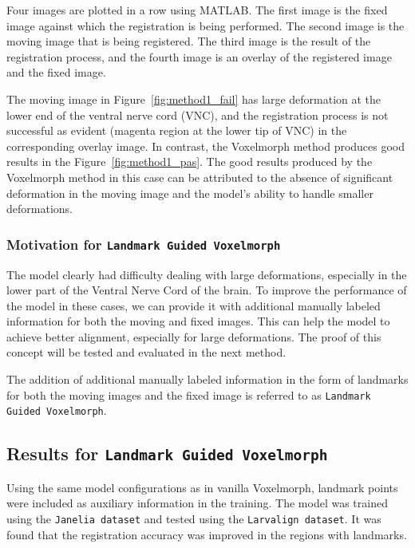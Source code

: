 \documentclass{book}
\begin{document}
	Four images are plotted in a row using MATLAB. The first image is the fixed image against which the registration is being performed. The second image is the moving image that is being registered. The third image is the result of the registration process, and the fourth image is an overlay of the registered image and the fixed image.
	
	The moving image in Figure~\ref{fig:method1_fail} has large deformation at the lower end of the ventral nerve cord (VNC), and the registration process is not successful as evident (magenta region at the lower tip of VNC) in the corresponding overlay image. In contrast, the Voxelmorph method produces good results in the Figure~\ref{fig:method1_pas}. The good results produced by the Voxelmorph method in this case can be attributed to the absence of significant deformation in the moving image and the model's ability to handle smaller deformations.

	
	\subsubsection{Motivation for \texttt{Landmark Guided Voxelmorph}} \label{subsec:motivation_for_method2}
	The model clearly had difficulty dealing with large deformations, especially in the lower part of the Ventral Nerve Cord of the brain. To improve the performance of the model in these cases, we can provide it with additional manually labeled information for both the moving and fixed images. This can help the model to achieve better alignment, especially for large deformations. The proof of this concept will be tested and evaluated in the next method.
	
	The addition of additional manually labeled information in the form of landmarks for both the moving images and the fixed image is referred to as \texttt{Landmark Guided Voxelmorph}.
	
	\subsection{Results for \texttt{Landmark Guided Voxelmorph}}
	Using the same model configurations as in vanilla Voxelmorph, landmark points were included as auxiliary information in the training. The model was trained using the \texttt{Janelia dataset} and tested using the \texttt{Larvalign dataset}. It was found that the registration accuracy was improved in the regions with landmarks.
	
\end{document}
